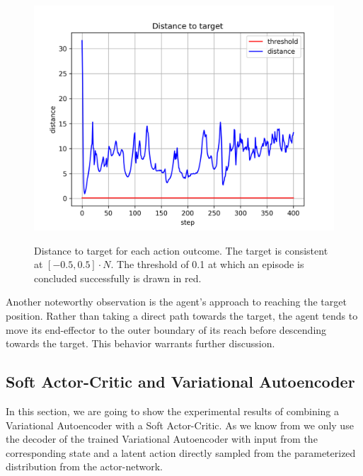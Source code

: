 \begin{figure}[h]
\begin{center}
{        \includegraphics[width=0.31 \linewidth]{figures/experiments/Distance_to_target_baseline_20_1691619159_5000.png}
            \label{fig:SAC_baseline_inference/distance_20}
            }
    \end{center}
    \caption[SAC baseline inference]{Distance to target for each action outcome. The target is consistent at $[-0.5, 0.5] \cdot N$. The threshold of 0.1 at which an episode is concluded successfully is drawn in red.} 
    \label{fig:SAC_baseline_inference_distance}
\end{figure}
Another noteworthy observation is the agent's approach to reaching the target position. Rather than taking a direct path towards the target, the agent tends to move its end-effector to the outer boundary of its reach before descending towards the target. This behavior warrants further discussion.

\subsection{Soft Actor-Critic and Variational Autoencoder}

In this section, we are going to show the experimental results of combining a Variational Autoencoder with a Soft Actor-Critic. As we know from  we only use the decoder of the trained Variational Autoencoder with input from the corresponding state and a latent action directly sampled from the parameterized distribution from the actor-network.

